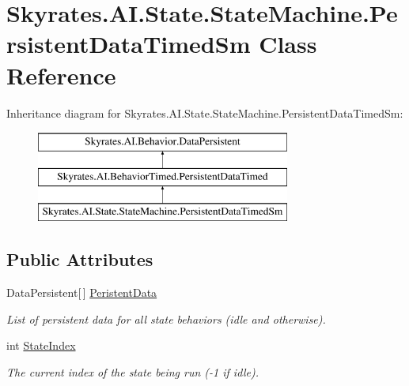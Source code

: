 \hypertarget{class_skyrates_1_1_a_i_1_1_state_1_1_state_machine_1_1_persistent_data_timed_sm}{\section{Skyrates.\-A\-I.\-State.\-State\-Machine.\-Persistent\-Data\-Timed\-Sm Class Reference}
\label{class_skyrates_1_1_a_i_1_1_state_1_1_state_machine_1_1_persistent_data_timed_sm}
}


 


Inheritance diagram for Skyrates.\-A\-I.\-State.\-State\-Machine.\-Persistent\-Data\-Timed\-Sm\-:\begin{figure}[H]
\begin{center}
\leavevmode
\includegraphics[height=3.000000cm]{class_skyrates_1_1_a_i_1_1_state_1_1_state_machine_1_1_persistent_data_timed_sm}
\end{center}
\end{figure}
\subsection*{Public Attributes}
\begin{DoxyCompactItemize}
\item 
Data\-Persistent\mbox{[}$\,$\mbox{]} \hyperlink{class_skyrates_1_1_a_i_1_1_state_1_1_state_machine_1_1_persistent_data_timed_sm_ad47deb6b3717c611995891f5f8bf3b08}{Peristent\-Data}
\begin{DoxyCompactList}\small\item\em List of persistent data for all state behaviors (idle and otherwise). \end{DoxyCompactList}\item 
int \hyperlink{class_skyrates_1_1_a_i_1_1_state_1_1_state_machine_1_1_persistent_data_timed_sm_a5f1edf5fa67ab1b21219bb378f62f778}{State\-Index}
\begin{DoxyCompactList}\small\item\em The current index of the state being run (-\/1 if idle). \end{DoxyCompactList}\end{DoxyCompactItemize}
